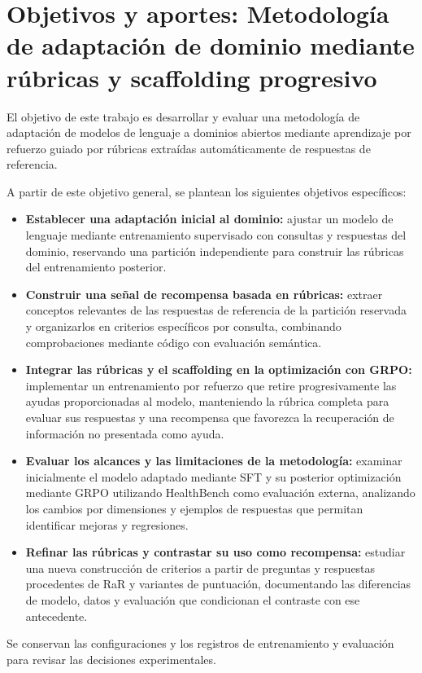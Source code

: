 \section{Objetivos y aportes: Metodología de adaptación de dominio mediante rúbricas y scaffolding progresivo}

El objetivo de este trabajo es desarrollar y evaluar una metodología de adaptación de modelos de lenguaje a dominios abiertos mediante aprendizaje por refuerzo guiado por rúbricas extraídas automáticamente de respuestas de referencia.

A partir de este objetivo general, se plantean los siguientes objetivos específicos:

\begin{itemize}
\item \textbf{Establecer una adaptación inicial al dominio:} ajustar un modelo de lenguaje mediante entrenamiento supervisado con consultas y respuestas del dominio, reservando una partición independiente para construir las rúbricas del entrenamiento posterior.
\item \textbf{Construir una señal de recompensa basada en rúbricas:} extraer conceptos relevantes de las respuestas de referencia de la partición reservada y organizarlos en criterios específicos por consulta, combinando comprobaciones mediante código con evaluación semántica.
\item \textbf{Integrar las rúbricas y el scaffolding en la optimización con GRPO:} implementar un entrenamiento por refuerzo que retire progresivamente las ayudas proporcionadas al modelo, manteniendo la rúbrica completa para evaluar sus respuestas y una recompensa que favorezca la recuperación de información no presentada como ayuda.
\item \textbf{Evaluar los alcances y las limitaciones de la metodología:} examinar inicialmente el modelo adaptado mediante SFT y su posterior optimización mediante GRPO utilizando HealthBench como evaluación externa, analizando los cambios por dimensiones y ejemplos de respuestas que permitan identificar mejoras y regresiones.
\item \textbf{Refinar las rúbricas y contrastar su uso como recompensa:} estudiar una nueva construcción de criterios a partir de preguntas y respuestas procedentes de RaR y variantes de puntuación, documentando las diferencias de modelo, datos y evaluación que condicionan el contraste con ese antecedente.
\end{itemize}

Se conservan las configuraciones y los registros de entrenamiento y evaluación para revisar las decisiones experimentales.
